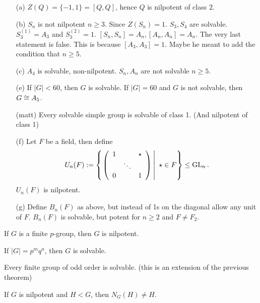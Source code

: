 \documentclass[11pt,leqno,oneside]{amsart}
\begin{document}
\begin{example*}[1.3.4]
  \begin{enumerate}
  \item[] %
  \item[(a)] \(Z(Q)=\{-1,1\}=[Q,Q]\), hence \(Q\) is nilpotent of class \(2\).
  \item[(b)] \(S_n\) is not nilpotent \(n \ge 3\). Since \(Z(S_n)=1\). \(S_3,S_4\) are solvable. \(S_3^{(1)}=A_3\) and
    \(S_3^{(2)}=1\). \([S_n,S_n]=A_n,[A_n,A_n]=A_n\).  The very last statement is false.  This is because \([A_3,A_3]=1\).  Maybe he meant to add the condition that $ n \geq 5$.
  \item[(c)] \(A_4\) is solvable, non-nilpotent. \(S_n,A_n\) are not solvable \(n \ge 5\).
  \item[(e)] If \(|G| < 60\), then \(G\) is solvable. If \(|G|=60\) and \(G\) is not solvable, then \(G \mathrel{\cong}
    A_5\).
  \item[(matt)] Every solvable simple group is solvable of class 1. (And nilpotent of class 1)
  \item[(f)] Let \(F\) be a field, then define
    \[U_n(F) := \left\{
       \left.\left( \begin{array}{c c c}
          1 & & \star\\
           & \ddots \\
          0& & 1
        \end{array}\right)\:\right\rvert \ \star \in F \right\} \le \operatorname{GL}_n.\]
  \(U_n(F)\) is nilpotent.
  \item[(g)] Define \(B_n(F)\) as above, but instead of 1s on the diagonal allow any unit of \(F\). \(B_n(F)\) is
    solvable, but potent for \(n \ge 2\) and \(F \neq F_2\).
  \end{enumerate}
\end{example*}
\begin{prop*}
  If \(G\) is a finite \(p\)-group, then \(G\) is nilpotent.
\end{prop*}
\begin{thm}
  If \(|G|=p^mq^n\), then \(G\) is solvable.
\end{thm}
\begin{thm}
    Every finite group of odd order is solvable.  (this is an extension of the previous theorem)
\end{thm}
\begin{prop*}[1.3.5]
  If \(G\) is nilpotent and \(H < G\), then \(N_G(H)\neq H\).
\end{prop*}
\end{document}
